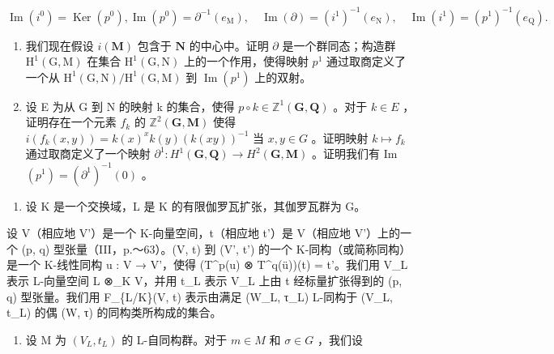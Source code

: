 \[
\operatorname{Im} \left(i ^ {0}\right) = \operatorname{Ker} \left(p ^ {0}\right), \operatorname{Im} \left(p ^ {0}\right) = \partial^ {- 1} (e _ {\mathrm{M}}), \quad \operatorname{Im} (\partial) = (i ^ {1}) ^ {- 1} \left(e _ {\mathrm{N}}\right), \quad \operatorname{Im} \left(i ^ {1}\right) = (p ^ {1}) ^ {- 1} \left(e _ {\mathrm{Q}}\right).
\]

\begin{enumerate}
\def\labelenumi{\alph{enumi})}
\setcounter{enumi}{4}
\item
  我们现在假设 \(i(\mathbf{M})\) 包含于 \(\mathbf{N}\) 的中心中。证明 \(\partial\) 是一个群同态；构造群 \(\mathrm{H}^{1}(\mathrm{G},\mathrm{M})\) 在集合 \(\mathrm{H}^{1}(\mathrm{G},\mathrm{N})\) 上的一个作用，使得映射 \(p^1\) 通过取商定义了一个从 \(\mathrm{H}^{1}(\mathrm{G},\mathrm{N}) / \mathrm{H}^{1}(\mathrm{G},\mathrm{M})\) 到 \(\operatorname{Im}(p^1)\) 上的双射。
\item
  设 E 为从 G 到 N 的映射 k 的集合，使得 \(p \circ k \in \mathbb{Z}^{1}(\mathbf{G}, \mathbf{Q})\) 。对于 \(k \in E\) ，证明存在一个元素 \(f_{k}\) 的 \(\mathbb{Z}^{2}(\mathbf{G}, \mathbf{M})\) 使得 \(i(f_{k}(x, y)) = k(x)^{x} k(y)(k(xy))^{-1}\) 当 \(x, y \in G\) 。证明映射 \(k \mapsto f_{k}\) 通过取商定义了一个映射 \(\partial^{1}: H^{1}(\mathbf{G}, \mathbf{Q}) \to H^{2}(\mathbf{G}, \mathbf{M})\) 。证明我们有 Im \((p^{1}) = (\partial^{1})^{-1}(0)\) 。
\end{enumerate}

\begin{enumerate}
\def\labelenumi{\arabic{enumi})}
\setcounter{enumi}{23}
\tightlist
\item
  设 K 是一个交换域，L 是 K 的有限伽罗瓦扩张，其伽罗瓦群为 G。
\end{enumerate}

设 V（相应地 V'）是一个 K-向量空间，t（相应地 t'）是 V（相应地 V'）上的一个 (p, q) 型张量（III，p.～63）。(V, t) 到 (V', t') 的一个 K-同构（或简称同构）是一个 K-线性同构 u : V → V'，使得 (T\^{}p(u) ⊗ T\^{}q(ü))(t) = t'。我们用 V\_L 表示 L-向量空间 L ⊗\_K V，并用 t\_L 表示 V\_L 上由 t 经标量扩张得到的 (p, q) 型张量。我们用 F\_\{L/K\}(V, t) 表示由满足 (W\_L, τ\_L) L-同构于 (V\_L, t\_L) 的偶 (W, τ) 的同构类所构成的集合。

\begin{enumerate}
\def\labelenumi{\alph{enumi})}
\tightlist
\item
  设 M 为 \((V_{L}, t_{L})\) 的 L-自同构群。对于 \(m \in M\) 和 \(\sigma \in G\) ，我们设
\end{enumerate}

